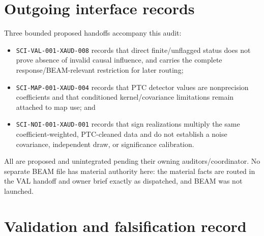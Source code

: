 \documentclass[11pt]{article}
\newcommand{\code}[1]{\nolinkurl{#1}}
\begin{document}
\section{Outgoing interface records}

Three bounded proposed handoffs accompany this audit:
\begin{itemize}[leftmargin=*]
\item \code{SCI-VAL-001-XAUD-008} records that direct finite/unflagged status
does not prove absence of invalid causal influence, and carries the complete
response/BEAM-relevant restriction for later routing;
\item \code{SCI-MAP-001-XAUD-004} records that PTC detector values are
nonprecision coefficients and that conditioned kernel/covariance limitations
remain attached to map use; and
\item \code{SCI-NOI-001-XAUD-001} records that sign realizations multiply the
same coefficient-weighted, PTC-cleaned data and do not establish a noise
covariance, independent draw, or significance calibration.
\end{itemize}
All are proposed and unintegrated pending their owning auditors/coordinator.
No separate BEAM file has material authority here: the material facts are
routed in the VAL handoff and owner brief exactly as dispatched, and BEAM was
not launched.

\section{Validation and falsification record}
\end{document}
